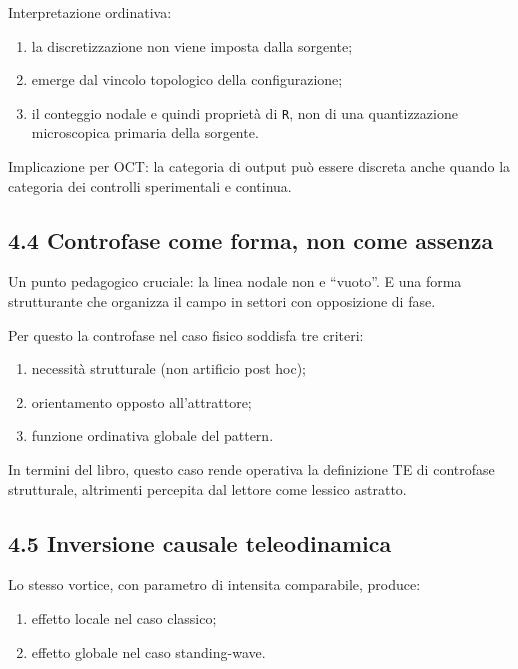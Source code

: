 Interpretazione ordinativa:

\begin{enumerate}
\def\labelenumi{\arabic{enumi}.}
\tightlist
\item
  la discretizzazione non viene imposta dalla sorgente;
\item
  emerge dal vincolo topologico della configurazione;
\item
  il conteggio nodale e quindi proprietà di \texttt{R}, non di una quantizzazione microscopica primaria della sorgente.
\end{enumerate}

Implicazione per OCT: la categoria di output può essere discreta anche quando la categoria dei controlli sperimentali e continua.

\subsection{4.4 Controfase come forma, non come assenza}

Un punto pedagogico cruciale: la linea nodale non e ``vuoto''. E una forma strutturante che organizza il campo in settori con opposizione di fase.

Per questo la controfase nel caso fisico soddisfa tre criteri:

\begin{enumerate}
\def\labelenumi{\arabic{enumi}.}
\tightlist
\item
  necessità strutturale (non artificio post hoc);
\item
  orientamento opposto all'attrattore;
\item
  funzione ordinativa globale del pattern.
\end{enumerate}

In termini del libro, questo caso rende operativa la definizione TE di controfase strutturale, altrimenti percepita dal lettore come lessico astratto.

\subsection{4.5 Inversione causale teleodinamica}

Lo stesso vortice, con parametro di intensita comparabile, produce:

\begin{enumerate}
\def\labelenumi{\arabic{enumi}.}
\tightlist
\item
  effetto locale nel caso classico;
\item
  effetto globale nel caso standing-wave.
\end{enumerate}

